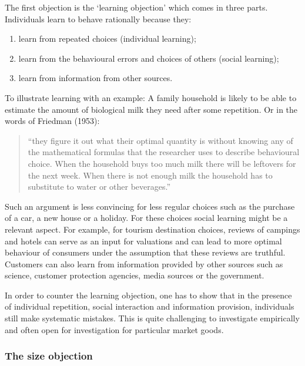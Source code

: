 \documentclass[
]{book}
\providecommand{\tightlist}{%
  \setlength{\itemsep}{0pt}\setlength{\parskip}{0pt}}
\begin{document}
The first objection is the `learning objection' which comes in three parts. Individuals learn to behave rationally because they:

\begin{enumerate}
\def\labelenumi{(\roman{enumi})}
\tightlist
\item
  learn from repeated choices (individual learning);
\item
  learn from the behavioural errors and choices of others (social learning);
\item
  learn from information from other sources.
\end{enumerate}

To illustrate learning with an example: A family household is likely to be able to estimate the amount of biological milk they need after some repetition. Or in the words of Friedman (1953):

\begin{quote}
``they figure it out what their optimal quantity is without knowing any of the mathematical formulas that the researcher uses to describe behavioural choice. When the household buys too much milk there will be leftovers for the next week. When there is not enough milk the household has to substitute to water or other beverages.''
\end{quote}

Such an argument is less convincing for less regular choices such as the purchase of a car, a new house or a holiday. For these choices social learning might be a relevant aspect. For example, for tourism destination choices, reviews of campings and hotels can serve as an input for valuations and can lead to more optimal behaviour of consumers under the assumption that these reviews are truthful. Customers can also learn from information provided by other sources such as science, customer protection agencies, media sources or the government.

In order to counter the learning objection, one has to show that in the presence of individual repetition, social interaction and information provision, individuals still make systematic mistakes. This is quite challenging to investigate empirically and often open for investigation for particular market goods.

\hypertarget{the-size-objection}{%
\subsubsection{The size objection}\label{the-size-objection}}
\end{document}
